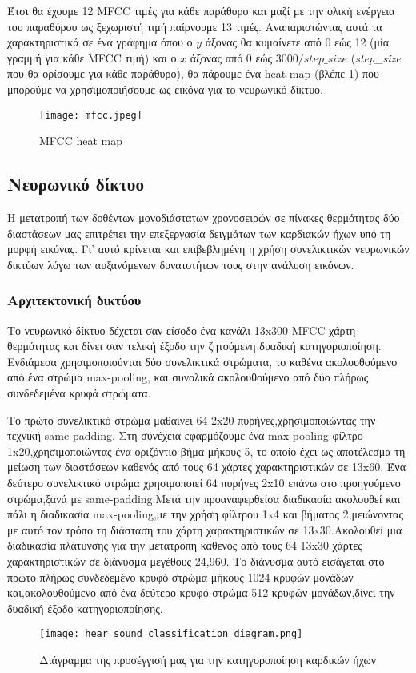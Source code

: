 Έτσι θα έχουμε 12 MFCC τιμές για κάθε παράθυρο και μαζί με την ολική ενέργεια
του παραθύρου ως ξεχωριστή τιμή παίρνουμε 13 τιμές. Αναπαριστώντας αυτά τα
χαρακτηριστικά σε ένα γράφημα όπου ο $y$ άξονας θα κυμαίνετε από 0 εώς 12 (μία
γραμμή για κάθε MFCC τιμή) και ο $x$ άξονας από 0 εώς $3000 / step\_size$
(\emph{step\_size} που θα ορίσουμε για κάθε παράθυρο), θα πάρουμε ένα heat map
(βλέπε \ref{mfcc}) που μπορούμε να χρησιμοποιήσουμε ως εικόνα για το νευρωνικό
δίκτυο.

\begin{figure}[H]
	\center
	\texttt{[image: mfcc.jpeg]}
	\caption{MFCC heat map \cite{fayek2016}}
	\label{mfcc}
\end{figure}

\subsection{Νευρωνικό δίκτυο}

Η μετατροπή των δοθέντων μονοδιάστατων χρονοσειρών σε πίνακες θερμότητας δύο διαστάσεων
μας επιτρέπει την επεξεργασία δειγμάτων των καρδιακών ήχων υπό τη μορφή εικόνας. Γι' αυτό
κρίνεται και επιβεβλημένη η χρήση συνελικτικών νευρωνικών δικτύων λόγω των αυξανόμενων
δυνατοτήτων τους στην ανάλυση εικόνων.
\subsubsection{Αρχιτεκτονική δικτύου}

Το νευρωνικό δίκτυο δέχεται σαν είσοδο ένα κανάλι 13x300 MFCC χάρτη θερμότητας
και δίνει σαν τελική έξοδο την ζητούμενη δυαδική κατηγοριοποίηση. Ενδιάμεσα
χρησιμοποιούνται δύο συνελικτικά στρώματα, το καθένα ακολουθούμενο από ένα
στρώμα max-pooling, και συνολικά ακολουθούμενο από δύο πλήρως συνδεδεμένα κρυφά
στρώματα. \par

Το πρώτο συνελικτικό στρώμα μαθαίνει 64 2x20 πυρήνες,χρησιμοποιώντας την τεχνική
same-padding.  Στη συνέχεια εφαρμόζουμε ένα max-pooling φίλτρο
1x20,χρησιμοποιώντας ένα οριζόντιο βήμα μήκους 5, το οποίο έχει ως αποτέλεσμα τη
μείωση των διαστάσεων καθενός από τους 64 χάρτες χαρακτηριστικών σε 13x60. Ένα
δεύτερο συνελικτικό στρώμα χρησιμοποιεί 64 πυρήνες 2x10 επάνω στο προηγούμενο
στρώμα,ξανά με same-padding.Μετά την προαναφερθείσα διαδικασία ακολουθεί και
πάλι η διαδικασία max-pooling,με την χρήση φίλτρου 1x4 και βήματος 2,μειώνοντας
με αυτό τον τρόπο τη διάσταση του χάρτη χαρακτηριστικών σε 13x30.Ακολουθεί μια
διαδικασία πλάτυνσης για την μετατροπή καθενός από τους 64 13x30 χάρτες
χαρακτηριστικών σε διάνυσμα μεγέθους 24,960. Το διάνυσμα αυτό εισάγεται στο
πρώτο πλήρως συνδεδεμένο κρυφό στρώμα μήκους 1024 κρυφών μονάδων
και,ακολουθούμενο από ένα δεύτερο κρυφό στρώμα 512 κρυφών μονάδων,δίνει την
δυαδική έξοδο κατηγοριοποίησης. \par

\begin{figure}[H]
	\center
	\texttt{[image: hear\_sound\_classification\_diagram.png]}
	\caption{Διάγραμμα της προσέγγισή μας για την κατηγοροποίηση καρδικών ήχων}
	\label{our_approach_diagram}
\end{figure}
